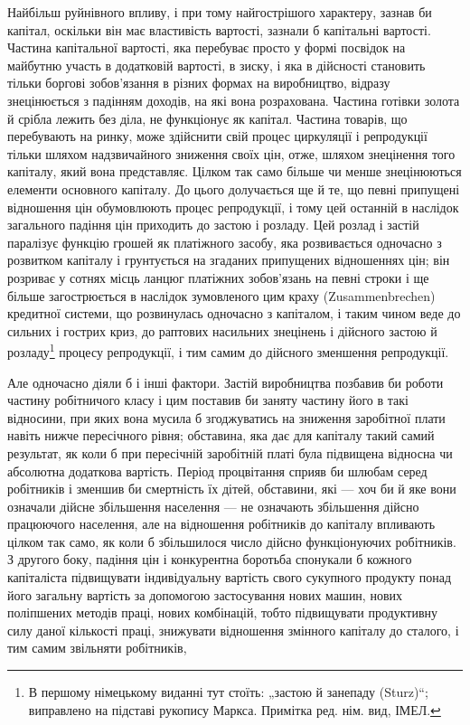 Найбільш руйнівного впливу, і при тому найгострішого
характеру, зазнав би капітал, оскільки він має властивість
вартості, зазнали б капітальні вартості. Частина капітальної
вартості, яка перебуває просто у формі посвідок на майбутню
участь в додатковій вартості, в зиску, і яка в дійсності становить
тільки боргові зобов’язання в різних формах на виробництво,
відразу знецінюється з падінням доходів, на які вона розрахована.
Частина готівки золота й срібла лежить без діла, не функціонує
як капітал. Частина товарів, що перебувають на ринку, може
здійснити свій процес циркуляції і репродукції тільки шляхом
надзвичайного зниження своїх цін, отже, шляхом знецінення
того капіталу, який вона представляє. Цілком так само більше
чи менше знецінюються елементи основного капіталу. До цього
долучається ще й те, що певні припущені відношення цін
обумовлюють процес репродукції, і тому цей останній в наслідок
загального падіння цін приходить до застою і розладу. Цей
розлад і застій паралізує функцію грошей як платіжного засобу,
яка розвивається одночасно з розвитком капіталу і грунтується
на згаданих припущених відношеннях цін; він розриває у сотнях
місць ланцюг платіжних зобов’язань на певні строки і ще більше
загострюється в наслідок зумовленого цим краху (Zusammenbrechen)
кредитної системи, що розвинулась одночасно з капіталом,
і таким чином веде до сильних і гострих криз, до раптових
насильних знецінень і дійсного застою й розладу\footnote*{
В першому німецькому виданні тут стоїть: „застою й занепаду (Sturz)“;
виправлено на підставі рукопису Маркса. Примітка ред. нім. вид, ІМЕЛ.
} процесу
репродукції, і тим самим до дійсного зменшення репродукції.

Але одночасно діяли б і інші фактори. Застій виробництва
позбавив би роботи частину робітничого класу і цим поставив би
заняту частину його в такі відносини, при яких вона мусила б
згоджуватись на зниження заробітної плати навіть нижче пересічного
рівня; обставина, яка дає для капіталу такий самий результат,
як коли б при пересічній заробітній платі була підвищена
відносна чи абсолютна додаткова вартість. Період процвітання
сприяв би шлюбам серед робітників і зменшив би смертність їх
дітей, обставини, які — хоч би й яке вони означали дійсне збільшення
населення — не означають збільшення дійсно працюючого
населення, але на відношення робітників до капіталу впливають
цілком так само, як коли б збільшилося число дійсно функціонуючих
робітників. З другого боку, падіння цін і конкурентна
боротьба спонукали б кожного капіталіста підвищувати індивідуальну
вартість свого сукупного продукту понад його загальну
вартість за допомогою застосування нових машин, нових поліпшених
методів праці, нових комбінацій, тобто підвищувати продуктивну
силу даної кількості праці, знижувати відношення
змінного капіталу до сталого, і тим самим звільняти робітників,
\parbreak{}  %
